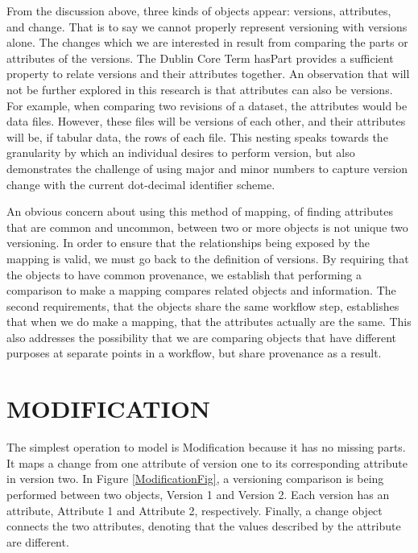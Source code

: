 From the discussion above, three kinds of objects appear: versions, attributes, and change.
That is to say we cannot properly represent versioning with versions alone.
The changes which we are interested in result from comparing the parts or attributes of the versions.
The Dublin Core Term hasPart provides a sufficient property to relate versions and their attributes together.
An observation that will not be further explored in this research is that attributes can also be versions.
For example, when comparing two revisions of a dataset, the attributes would be data files.
However, these files will be versions of each other, and their attributes will be, if tabular data, the rows of each file.
This nesting speaks towards the granularity by which an individual desires to perform version, but also demonstrates the challenge of using major and minor numbers to capture version change with the current dot-decimal identifier scheme.

An obvious concern about using this method of mapping, of finding attributes that are common and uncommon, between two or more objects is not unique two versioning.
In order to ensure that the relationships being exposed by the mapping is valid, we must go back to the definition of versions.
By requiring that the objects to have common provenance, we establish that performing a comparison to make a mapping compares related objects and information.
The second requirements, that the objects share the same workflow step, establishes that when we do make a mapping, that the attributes actually are the same.
This also addresses the possibility that we are comparing objects that have different purposes at separate points in a workflow, but share provenance as a result.

\section{MODIFICATION}

The simplest operation to model is Modification because it has no missing parts.
It maps a change from one attribute of version one to its corresponding attribute in version two.
In Figure \ref{ModificationFig}, a versioning comparison is being performed between two objects, Version 1 and Version 2.
Each version has an attribute, Attribute 1 and Attribute 2, respectively.
Finally, a change object connects the two attributes, denoting that the values described by the attribute are different.


